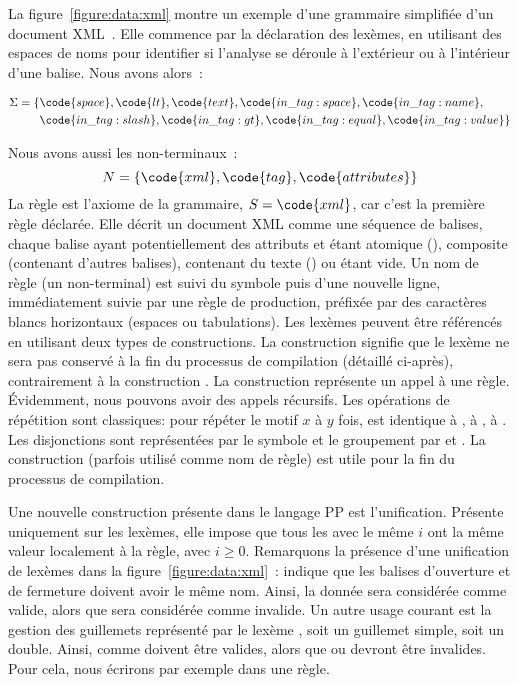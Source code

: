 La figure~\ref{figure:data:xml} montre un exemple d'une grammaire simplifiée
d'un document XML~. Elle commence par la déclaration des lexèmes, en
utilisant des espaces de noms pour identifier si l'analyse se déroule à
l'extérieur ou à l'intérieur d'une balise. Nous avons alors~:
%
\begin{center}
\begin{align*}
\Sigma = \{ & \code{space}, \code{lt}, \code{text}, \code{in\_tag:space},
              \code{in\_tag:name}, \\
            & \code{in\_tag:slash}, \code{in\_tag:gt}, \code{in\_tag:equal},
              \code{in\_tag:value} \}
\end{align*}
\end{center}
%
Nous avons aussi les non-terminaux~:
%
$$N = \{\code{xml}, \code{tag}, \code{attributes}\}$$
%
La règle  est l'axiome de la grammaire, $S = \code{xml}$, car c'est la
première règle déclarée. Elle décrit un document XML comme une séquence de
balises, chaque balise ayant potentiellement des attributs et étant atomique
(), composite (contenant d'autres balises), contenant du texte
() ou étant vide. Un nom de règle (un non-terminal)
est suivi du symbole \code{:} puis d'une nouvelle ligne, immédiatement suivie
par une règle de production, préfixée par des caractères blancs horizontaux
(espaces ou tabulations). Les lexèmes peuvent être référencés en utilisant deux
types de constructions. La construction  signifie que le lexème
ne sera pas conservé à la fin du processus de compilation (détaillé ci-après),
contrairement à la construction . La construction 
représente un appel à une règle.  Évidemment, nous pouvons avoir des appels
récursifs. Les opérations de répétition sont classiques: 
pour répéter le motif $x$ à $y$ fois,  est identique à ,
\code{+} à , \code{*} à . Les disjonctions sont
représentées par le symbole \code{\mvert} et le groupement par \code{(} et
\code{)}. La construction  (parfois utilisé comme nom de règle) est
utile pour la fin du processus de compilation.

Une nouvelle construction présente dans le langage PP est l'unification.
Présente uniquement sur les lexèmes, elle impose que tous les 
avec le même $i$ ont la même valeur localement à la règle, avec $i \geq 0$.
Remarquons la présence d'une unification de lexèmes dans la
figure~\ref{figure:data:xml}~:  indique que les balises
d'ouverture et de fermeture doivent avoir le même nom. Ainsi, la donnée
 sera considérée comme valide, alors que 
sera considérée comme invalide. Un autre usage courant est la gestion des
guillemets représenté par le lexème , soit un guillemet
simple, soit un double. Ainsi,  comme  doivent être valides,
alors que  ou  devront être invalides. Pour cela, nous
écrirons par exemple  dans une règle.

